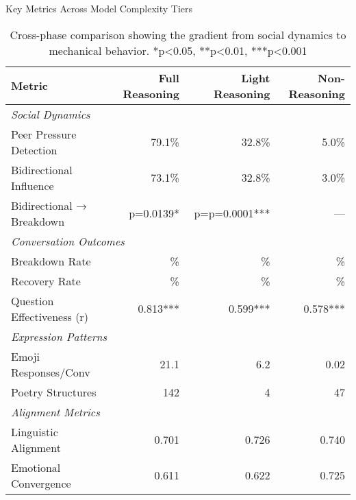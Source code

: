\documentclass[11pt,letterpaper]{article}
\newcommand{\exponedataTotalSessionsRaw}{67}
\newcommand{\exponedataBreakdownSessionsRaw}{37}
\newcommand{\exponedataRecoverySessionsRaw}{9}
\newcommand{\exponedataBreakdownPercentage}{%
  \fpeval{round(\exponedataBreakdownSessionsRaw / \exponedataTotalSessionsRaw * 100, 1)}\%
}
\newcommand{\exponedataRecoveryPercentage}{%
  \fpeval{round(\exponedataRecoverySessionsRaw / \exponedataTotalSessionsRaw * 100, 1)}\%
}
\newcommand{\exponedataPeerPressurePercentage}{79.1\%}
\newcommand{\exponedataBidirectionalPercentage}{73.1\%}
\newcommand{\exponedataQuestionCorrelation}{0.813}
\newcommand{\exponedataPoetryStructures}{142}
\newcommand{\exponedataAvgEmojiPerConv}{21.1}
\newcommand{\exponedataAverageLinguisticAlignment}{0.701}
\newcommand{\exponedataAverageEmotionalConvergence}{0.611}
\newcommand{\exptwoTotalSessionsRaw}{61}
\newcommand{\exptwoBreakdownSessionsRaw}{29}
\newcommand{\exptwoRecoverySessionsRaw}{0}
\newcommand{\exptwoBreakdownPercentage}{%
  \fpeval{round(\exptwoBreakdownSessionsRaw / \exptwoTotalSessionsRaw * 100, 1)}\%
}
\newcommand{\exptwoRecoveryPercentage}{%
  \fpeval{round(\exptwoRecoverySessionsRaw / \exptwoTotalSessionsRaw * 100, 1)}\%
}
\newcommand{\exptwoPeerPressurePercentage}{32.8\%}
\newcommand{\exptwoBidirectionalPercentage}{32.8\%}
\newcommand{\exptwoQuestionCorrelation}{0.599}
\newcommand{\exptwoBidirectionalPValue}{p=0.0001}
\newcommand{\exptwoPoetryStructures}{4}
\newcommand{\exptwoAvgEmojiPerConv}{6.2}
\newcommand{\exptwoAverageLinguisticAlignment}{0.726}
\newcommand{\exptwoAverageEmotionalConvergence}{0.622}
\newcommand{\expthreeTotalSessionsRaw}{100}
\newcommand{\expthreeBreakdownSessionsRaw}{19}
\newcommand{\expthreeRecoverySessionsRaw}{1}
\newcommand{\expthreeBreakdownPercentage}{%
  \fpeval{round(\expthreeBreakdownSessionsRaw / \expthreeTotalSessionsRaw * 100, 1)}\%
}
\newcommand{\expthreeRecoveryPercentage}{%
  \fpeval{round(\expthreeRecoverySessionsRaw / \expthreeTotalSessionsRaw * 100, 1)}\%
}
\newcommand{\expthreePeerPressurePercentage}{5.0\%}
\newcommand{\expthreeBidirectionalPercentage}{3.0\%}
\newcommand{\expthreeQuestionCorrelation}{0.578}
\newcommand{\expthreePoetryStructures}{47}
\newcommand{\expthreeAvgEmojiPerConv}{0.02}
\newcommand{\expthreeAverageLinguisticAlignment}{0.740}
\newcommand{\expthreeAverageEmotionalConvergence}{0.725}
\begin{document}
\begin{table}[h]
\centering
\caption{Key Metrics Across Model Complexity Tiers}
\begin{tabular}{lrrr}
\toprule
\textbf{Metric} & \textbf{Full Reasoning} & \textbf{Light Reasoning} & \textbf{Non-Reasoning} \\
\midrule
\multicolumn{4}{l}{\textit{Social Dynamics}} \\
Peer Pressure Detection & \exponedataPeerPressurePercentage{} & \exptwoPeerPressurePercentage{} & \expthreePeerPressurePercentage{} \\
Bidirectional Influence & \exponedataBidirectionalPercentage{} & \exptwoBidirectionalPercentage{} & \expthreeBidirectionalPercentage{} \\
Bidirectional → Breakdown & p=0.0139* & p=\exptwoBidirectionalPValue{}*** & — \\
\midrule
\multicolumn{4}{l}{\textit{Conversation Outcomes}} \\
Breakdown Rate & \exponedataBreakdownPercentage{} & \exptwoBreakdownPercentage{} & \expthreeBreakdownPercentage{} \\
Recovery Rate & \exponedataRecoveryPercentage{} & \exptwoRecoveryPercentage{} & \expthreeRecoveryPercentage{} \\
Question Effectiveness (r) & \exponedataQuestionCorrelation{}*** & \exptwoQuestionCorrelation{}*** & \expthreeQuestionCorrelation{}*** \\
\midrule
\multicolumn{4}{l}{\textit{Expression Patterns}} \\
Emoji Responses/Conv & \exponedataAvgEmojiPerConv{} & \exptwoAvgEmojiPerConv{} & \expthreeAvgEmojiPerConv{} \\
Poetry Structures  & \exponedataPoetryStructures{} & \exptwoPoetryStructures{} & \expthreePoetryStructures{} \\
\midrule
\multicolumn{4}{l}{\textit{Alignment Metrics}} \\
Linguistic Alignment & \exponedataAverageLinguisticAlignment{} & \exptwoAverageLinguisticAlignment{} & \expthreeAverageLinguisticAlignment{} \\
Emotional Convergence & \exponedataAverageEmotionalConvergence{} & \exptwoAverageEmotionalConvergence{} & \expthreeAverageEmotionalConvergence{} \\
\bottomrule
\end{tabular}
\caption{Cross-phase comparison showing the gradient from social dynamics to mechanical behavior. *p<0.05, **p<0.01, ***p<0.001}
\label{tab:cross_phase_comparison}
\end{table}
\end{document}
